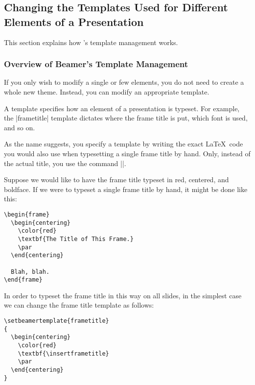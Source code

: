 \subsection{Changing the Templates Used for Different Elements of a Presentation}

This section explains how \beamer's template management works.



\subsubsection{Overview of Beamer's Template Management}

If you only wish to modify a single or few elements, you do not need
to create a whole new theme. Instead, you can modify an appropriate
template. 

A template specifies how an element of a presentation is typeset. For 
example, the |frametitle| template dictates where the frame title is
put, which font is used, and so on.

As the name suggests, you specify a template by writing the exact
\LaTeX\ code you would also use when typesetting a single frame title
by hand. Only, instead of the actual title, you use the command
|\insertframetitle|.

\example
Suppose we would like to have the frame title typeset in
red, centered, and boldface. If we were to typeset a single frame
title by hand, it might be done like this:
\begin{verbatim}
\begin{frame}
  \begin{centering}
    \color{red}
    \textbf{The Title of This Frame.}
    \par
  \end{centering}

  Blah, blah.
\end{frame}
\end{verbatim}

In order to typeset the frame title in this way on all slides, in the
simplest case we can change the frame title template as follows:
\begin{verbatim}
\setbeamertemplate{frametitle}
{
  \begin{centering}
    \color{red}
    \textbf{\insertframetitle}
    \par
  \end{centering}
}
\end{verbatim}

